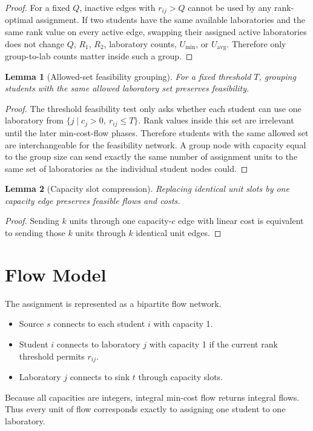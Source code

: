 \documentclass[11pt,a4paper]{article}
\newtheorem{lemma}{Lemma}
\begin{document}
\begin{proof}
For a fixed \(Q\), inactive edges with \(r_{ij}>Q\) cannot be used by any
rank-optimal assignment.  If two students have the same available
laboratories and the same rank value on every active edge, swapping their
assigned active laboratories does not change \(Q\), \(R_1\), \(R_2\),
laboratory counts, \(U_{\min}\), or \(U_{\mathrm{avg}}\).  Therefore only
group-to-lab counts matter inside such a group.
\end{proof}

\begin{lemma}[Allowed-set feasibility grouping]
For a fixed threshold \(T\), grouping students with the same allowed
laboratory set preserves feasibility.
\end{lemma}

\begin{proof}
The threshold feasibility test only asks whether each student can use one
laboratory from \(\{j\mid c_j>0,\ r_{ij}\leq T\}\).  Rank values inside this
set are irrelevant until the later min-cost-flow phases.  Therefore students
with the same allowed set are interchangeable for the feasibility network.
A group node with capacity equal to the group size can send exactly the same
number of assignment units to the same set of laboratories as the individual
student nodes could.
\end{proof}

\begin{lemma}[Capacity slot compression]
Replacing identical unit slots by one capacity edge preserves feasible flows
and costs.
\end{lemma}

\begin{proof}
Sending \(k\) units through one capacity-\(c\) edge with linear cost is
equivalent to sending those \(k\) units through \(k\) identical unit edges.
\end{proof}

\section{Flow Model}

The assignment is represented as a bipartite flow network.
\begin{itemize}[leftmargin=2em]
  \item Source \(s\) connects to each student \(i\) with capacity 1.
  \item Student \(i\) connects to laboratory \(j\) with capacity 1 if the
        current rank threshold permits \(r_{ij}\).
  \item Laboratory \(j\) connects to sink \(t\) through capacity slots.
\end{itemize}
Because all capacities are integers, integral min-cost flow returns integral
flows.  Thus every unit of flow corresponds exactly to assigning one student
to one laboratory.
\end{document}
